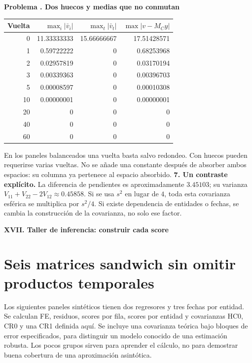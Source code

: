 \documentclass[11pt,a4paper]{article}
\theoremstyle{definition}
\newcommand{\parte}[1]{\par\bigskip\Needspace{8\baselineskip}\begin{center}{\Large\bfseries\color{azul}#1}\end{center}}
\newcounter{problema}
\newenvironment{resuelto}[1]{\refstepcounter{problema}\par\medskip\Needspace{6\baselineskip}\textbf{Problema \theproblema. #1}\par}{\par\medskip}
\begin{document}
\begin{resuelto}{Dos huecos y medias que no conmutan}
\begin{center}\small
\begin{tabular}{rrrr}
\toprule
Vuelta&$\max_i|\bar v_i|$&$\max_t|\bar v_t|$&$\max|v-M_Cy|$\\
\midrule
0&11.33333333&15.66666667&17.51428571\\
1&0.59722222&0&0.68253968\\
2&0.02957819&0&0.03170194\\
3&0.00339363&0&0.00396703\\
5&0.00008597&0&0.00010308\\
10&0.00000001&0&0.00000001\\
20&0&0&0\\
40&0&0&0\\
60&0&0&0\\
\bottomrule
\end{tabular}
\end{center}
En los paneles balanceados una vuelta basta salvo redondeo. Con huecos pueden requerirse varias vueltas. No se añade una constante después de absorber ambos espacios: su columna ya pertenece al espacio absorbido.
\textbf{7. Un contraste explícito.} La diferencia de pendientes es aproximadamente $3.45103$; su varianza $V_{11}+V_{22}-2V_{12}\approx0.45858$. Si se usa $s^2$ en lugar de $4$, toda esta covarianza esférica se multiplica por $s^2/4$. Si existe dependencia de entidades o fechas, se cambia la construcción de la covarianza, no solo ese factor.
\end{resuelto}


\parte{XVII. Taller de inferencia: construir cada score}
\section{Seis matrices sandwich sin omitir productos temporales}
Los siguientes paneles sintéticos tienen dos regresores y tres fechas por entidad. Se calculan FE, residuos, scores por fila, scores por entidad y covarianzas HC0, CR0 y una CR1 definida aquí. Se incluye una covarianza teórica bajo bloques de error especificados, para distinguir un modelo conocido de una estimación robusta. Los pocos grupos sirven para aprender el cálculo, no para demostrar buena cobertura de una aproximación asintótica.
\end{document}

